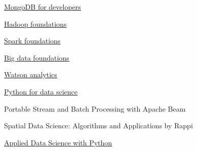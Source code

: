 %
%
%


\begin{coursework}


        {\href{https://university.mongodb.com/course_completion/30f19185172f43e58ae4a0cd9ce13ff0}
        {\underline{MongoDB for developers}}}

        {\href{https://www.youracclaim.com/badges/714d2307-3169-496f-a521-17aeb790f099/public_url}
        {\underline{Hadoop foundations}}}

        {\href{https://www.youracclaim.com/badges/c11a6bc7-ee82-42e6-b9d3-b21c08d68d60/public_url}
        {\underline{Spark foundations}}}

        {\href{https://www.youracclaim.com/badges/fb7b0207-6a42-49fc-bf3e-48d139e150c6/public_url}
        {\underline{Big data foundations}}}

        {\href{https://www.youracclaim.com/badges/89aa54fb-143a-4053-9a97-a7b1461e1f60/public_url}
        {\underline{Watson analytics}}}


        {\href{https://courses.edx.org/certificates/0626a02340944e6b9b1854be5e171da0}
        {\underline{Python for data science}}}

        {Portable Stream and Batch Processing with Apache Beam}



    
        {Spatial Data Science: Algorithms and Applications by Rappi}
    
        {\href{https://www.youracclaim.com/badges/6f524dff-5ffb-42bd-8e32-f4f3ea50e26c/public_url}
        {\underline{Applied Data Science with Python}}}

\end{coursework}